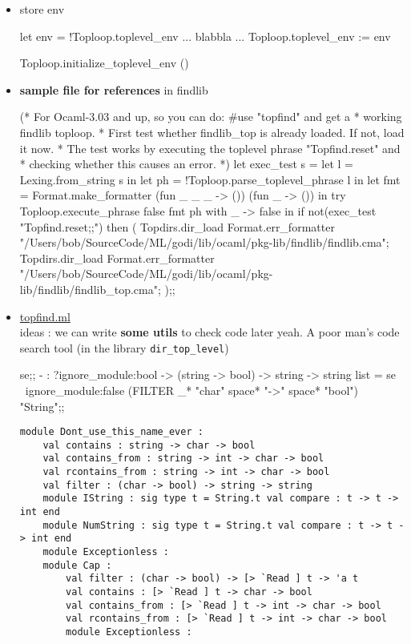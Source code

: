 \begin{enumerate}
\begin{itemize}
\item store env

  \begin{bluecode}
let env = !Toploop.toplevel_env
... blabbla ...     
Toploop.toplevel_env := env     
\end{bluecode}
\begin{bluecode}
Toploop.initialize_toplevel_env ()  
\end{bluecode}
  \item \textbf{sample file  for references } in findlib


\begin{redcode}
(* For Ocaml-3.03 and up, so you can do: #use "topfind" and get a
 * working findlib toploop.
 * First test whether findlib_top is already loaded. If not, load it now.
 * The test works by executing the toplevel phrase "Topfind.reset" and
 * checking whether this causes an error.
 *)
let exec_test s =
  let l = Lexing.from_string s in
  let ph = !Toploop.parse_toplevel_phrase l in
  let fmt = Format.make_formatter (fun _ _ _ -> ()) (fun _ -> ()) in
  try
    Toploop.execute_phrase false fmt ph
  with
      _ -> false
in
if not(exec_test "Topfind.reset;;") then (
  Topdirs.dir_load Format.err_formatter "/Users/bob/SourceCode/ML/godi/lib/ocaml/pkg-lib/findlib/findlib.cma";
  Topdirs.dir_load Format.err_formatter "/Users/bob/SourceCode/ML/godi/lib/ocaml/pkg-lib/findlib/findlib_top.cma";
);;
\end{redcode}

    
  \item \href{file:/Users/bob/SourceCode/ML/godi/build/distfiles/findlib-1.2.7/src/findlib/topfind.ml}{topfind.ml} \\
    ideas : we can write \textbf{some utils} to check code later 
    yeah. A poor man's code search tool (in the library \verb|dir_top_level|)


\begin{alternate}
se;;
- : ?ignore_module:bool -> (string -> bool) -> string -> string list =
se ~ignore_module:false (FILTER _*  "char" space* "->" space* "bool") "String";;
\end{alternate}

\begin{lstlisting}
module Dont_use_this_name_ever :
    val contains : string -> char -> bool
    val contains_from : string -> int -> char -> bool
    val rcontains_from : string -> int -> char -> bool
    val filter : (char -> bool) -> string -> string
    module IString : sig type t = String.t val compare : t -> t -> int end
    module NumString : sig type t = String.t val compare : t -> t -> int end
    module Exceptionless :
    module Cap :
        val filter : (char -> bool) -> [> `Read ] t -> 'a t
        val contains : [> `Read ] t -> char -> bool
        val contains_from : [> `Read ] t -> int -> char -> bool
        val rcontains_from : [> `Read ] t -> int -> char -> bool
        module Exceptionless :
\end{lstlisting}



\end{itemize}
\end{enumerate}
